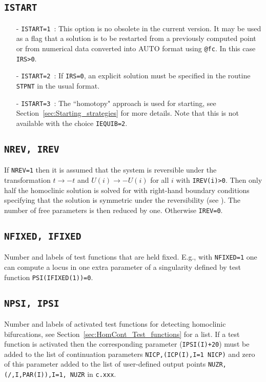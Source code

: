 \documentclass[12pt]{report}
\begin{document}
\subsection{\tt ISTART}  \label{sec:ISTART}
\begin{itemize}
\item[-] {\tt ISTART=1}~:  
This option is no obsolete in the current version. 
It may be used as a flag that a solution is to be
restarted from a previously computed point or
from numerical data converted into {\cal AUTO} format using {\tt @fc}.
In this case {\tt IRS>0}.
\item[-] {\tt ISTART=2}~: 
If {\tt IRS=0}, an explicit solution must be specified in the
routine {\tt STPNT} in the usual format. 
\item[-] {\tt ISTART=3}~: 
The ``homotopy" approach is used for starting, see 
Section~\ref{sec:Starting_strategies} 
for more details. Note that this is not available with the choice 
{\tt IEQUIB=2}.
\end{itemize}

\subsection{\tt NREV, IREV}  \label{sec:IREV}
If {\tt NREV=1} then it is assumed that
the system is reversible under the transformation 
$t \to -t$ and $U(i) \to -U(i)$ for all $i$ with 
{\tt IREV(i)>0}. Then only half the homoclinic solution is
solved for with right-hand boundary conditions specifying
that the solution is symmetric under the reversibility
(see ). The number of free parameters
is then reduced by one. Otherwise {\tt IREV=0}.

\subsection{\tt NFIXED, IFIXED}  \label{sec:IFIXED}
Number and labels of test functions that are held fixed. 
E.g., with {\tt NFIXED=1} one can compute a locus in
one extra parameter of a singularity defined by 
test function {\tt PSI(IFIXED(1))=0}.

\subsection{\tt NPSI, IPSI}  \label{sec:IPSI}
Number and labels of activated test functions for detecting homoclinic
bifurcations, see Section~\ref{sec:HomCont_Test_functions} 
for a list. If a test function is activated then the
corresponding parameter ({\tt IPSI(I)+20}) 
must be added to the list of continuation parameters {\tt NICP,(ICP(I),I=1 NICP)}
and zero of this parameter added to the list of user-defined
output points {\tt NUZR,} {\tt (/,I,PAR(I)),I=1, NUZR} in {\tt c.xxx}.
\end{document}
